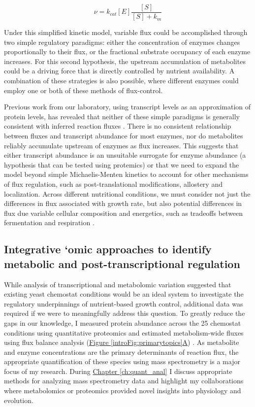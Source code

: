 \begin{equation}
\nu = k_{cat}\left[E\right]\frac{\left[S\right]}{\left[S\right] + k_{m}}\label{intoEqtn:mm}
\end{equation}

Under this simplified kinetic model, variable flux could be accomplished through two simple regulatory paradigms: either the concentration of enzymes changes proportionally to their flux, or the fractional substrate occupancy of each enzyme increases. For this second hypothesis, the upstream accumulation of metabolites could be a driving force that is directly controlled by nutrient availability. A combination of these strategies is also possible, where different enzymes could employ one or both of these methods of flux-control. 

Previous work from our laboratory, using transcript levels as an approximation of protein levels, has revealed that neither of these simple paradigms is generally consistent with inferred reaction fluxes \cite{Bradley:2009fj}. There is no consistent relationship between fluxes and transcript abundance for most enzymes, nor do metabolites reliably accumulate upstream of enzymes as flux increases. This suggests that either transcript abundance is an unsuitable surrogate for enzyme abundance (a hypothesis that can be tested using protemics) or that we need to expand the model beyond simple Michaelis-Menten kinetics to account for other mechanisms of flux regulation, such as post-translational modifications, allostery and localization. Across different nutritional conditions, we must consider not just the differences in flux associated with growth rate, but also potential differences in flux due variable cellular composition and energetics, such as tradeoffs between fermentation and respiration \cite{Lange:2001th, Feist:2010hq, BARFORD:1979ei}.

\subsection{Integrative `omic approaches to identify metabolic and post-transcriptional regulation}

While analysis of transcriptional and metabolomic variation suggested that existing yeast chemostat conditions would be an ideal system to investigate the regulatory underpinnings of nutrient-based growth control, additional data was required if we were to meaningfully address this question. To greatly reduce the gaps in our knowledge, I measured protein abundance across the 25 chemostat conditions using quantitative proteomics and estimated metabolism-wide fluxes using flux balance analysis (\hyperref[introFig:primarytopics]{Figure \ref{introFig:primarytopics}A}) \cite{Orth:2010hb}. As metabolite and enzyme concentrations are the primary determinants of reaction flux, the appropriate quantification of these species using mass spectrometry is a major focus of my research. During \hyperref[ch:quant_anal]{Chapter \ref{ch:quant_anal}} I discuss appropriate methods for analyzing mass spectrometry data and highlight my collaborations where metabolomics or proteomics provided novel insights into physiology and evolution. 

